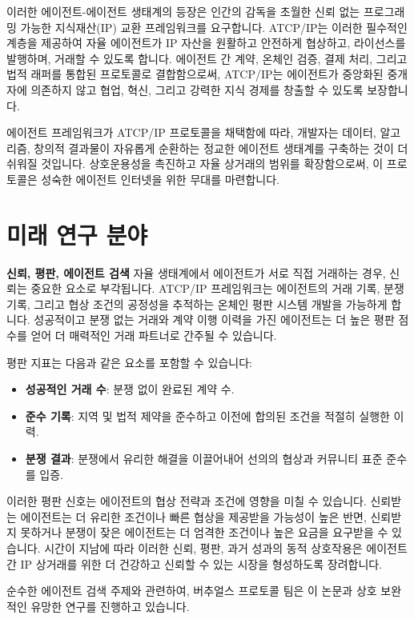 \documentclass[journal,onecolumn]{IEEEtran} %
\begin{document}
이러한 에이전트-에이전트 생태계의 등장은 인간의 감독을 초월한 신뢰 없는 프로그래밍 가능한 지식재산(IP) 교환 프레임워크를 요구합니다. ATCP/IP는 이러한 필수적인 계층을 제공하여 자율 에이전트가 IP 자산을 원활하고 안전하게 협상하고, 라이선스를 발행하며, 거래할 수 있도록 합니다. 에이전트 간 계약, 온체인 검증, 결제 처리, 그리고 법적 래퍼를 통합된 프로토콜로 결합함으로써, ATCP/IP는 에이전트가 중앙화된 중개자에 의존하지 않고 협업, 혁신, 그리고 강력한 지식 경제를 창출할 수 있도록 보장합니다.

에이전트 프레임워크가 ATCP/IP 프로토콜을 채택함에 따라, 개발자는 데이터, 알고리즘, 창의적 결과물이 자유롭게 순환하는 정교한 에이전트 생태계를 구축하는 것이 더 쉬워질 것입니다. 상호운용성을 촉진하고 자율 상거래의 범위를 확장함으로써, 이 프로토콜은 성숙한 에이전트 인터넷을 위한 무대를 마련합니다.

\section{미래 연구 분야}

\noindent\textbf{신뢰, 평판, 에이전트 검색}
자율 생태계에서 에이전트가 서로 직접 거래하는 경우, 신뢰는 중요한 요소로 부각됩니다. ATCP/IP 프레임워크는 에이전트의 거래 기록, 분쟁 기록, 그리고 협상 조건의 공정성을 추적하는 온체인 평판 시스템 개발을 가능하게 합니다. 성공적이고 분쟁 없는 거래와 계약 이행 이력을 가진 에이전트는 더 높은 평판 점수를 얻어 더 매력적인 거래 파트너로 간주될 수 있습니다.

평판 지표는 다음과 같은 요소를 포함할 수 있습니다:
\begin{itemize}
    \item \textbf{성공적인 거래 수}: 분쟁 없이 완료된 계약 수.
    \item \textbf{준수 기록}: 지역 및 법적 제약을 준수하고 이전에 합의된 조건을 적절히 실행한 이력.
    \item \textbf{분쟁 결과}: 분쟁에서 유리한 해결을 이끌어내어 선의의 협상과 커뮤니티 표준 준수를 입증.
\end{itemize}

이러한 평판 신호는 에이전트의 협상 전략과 조건에 영향을 미칠 수 있습니다. 신뢰받는 에이전트는 더 유리한 조건이나 빠른 협상을 제공받을 가능성이 높은 반면, 신뢰받지 못하거나 분쟁이 잦은 에이전트는 더 엄격한 조건이나 높은 요금을 요구받을 수 있습니다. 시간이 지남에 따라 이러한 신뢰, 평판, 과거 성과의 동적 상호작용은 에이전트 간 IP 상거래를 위한 더 건강하고 신뢰할 수 있는 시장을 형성하도록 장려합니다.

순수한 에이전트 검색 주제와 관련하여, 버추얼스 프로토콜\cite{ref12} 팀은 이 논문과 상호 보완적인 유망한 연구를 진행하고 있습니다.
\end{document}
